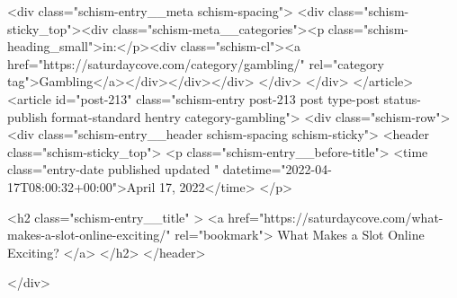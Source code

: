 {		<div class="schism-entry__meta schism-spacing">			<div class="schism-sticky_top"><div class="schism-meta__categories"><p class="schism-heading_small">in:</p><div class="schism-cl"><a href="https://saturdaycove.com/category/gambling/" rel="category tag">Gambling</a></div></div></div>		</div>
	</div>
</article>
<article id="post-213" class="schism-entry post-213 post type-post status-publish format-standard hentry category-gambling">
	<div class="schism-row">		<div class="schism-entry__header schism-spacing schism-sticky">			<header class="schism-sticky_top">				<p class="schism-entry__before-title">
					<time class="entry-date published updated " datetime="2022-04-17T08:00:32+00:00">April 17, 2022</time>				</p>

				<h2 class="schism-entry__title" >
					<a href="https://saturdaycove.com/what-makes-a-slot-online-exciting/" rel="bookmark">
						What Makes a Slot Online Exciting?					</a>
				</h2>
			</header>

					</div>

}
